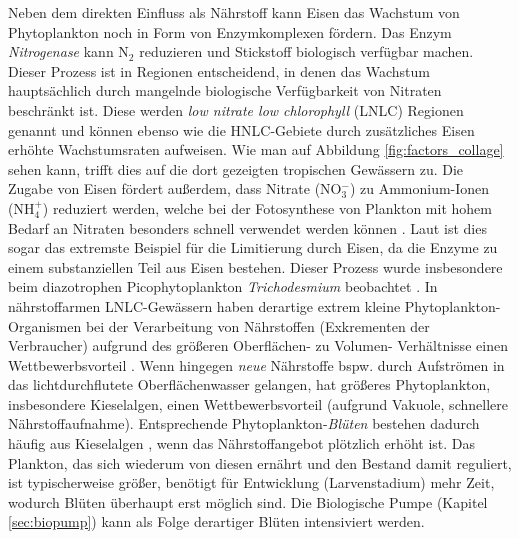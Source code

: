 \documentclass[12pt,a4paper,onecolumn]{scrartcl}
\begin{document}
Neben dem direkten Einfluss als Nährstoff kann Eisen das Wachstum von Phytoplankton noch in Form von Enzymkomplexen fördern. Das Enzym \textit{Nitrogenase} kann N$_2$ reduzieren und Stickstoff biologisch verfügbar machen. Dieser Prozess ist in Regionen entscheidend, in denen das Wachstum hauptsächlich durch mangelnde biologische Verfügbarkeit von Nitraten beschränkt ist. Diese werden \textit{low nitrate low chlorophyll} (LNLC) Regionen genannt und können ebenso wie die HNLC-Gebiete durch zusätzliches Eisen erhöhte Wachstumsraten aufweisen. Wie man auf Abbildung \ref{fig:factors_collage} sehen kann, trifft dies auf die dort gezeigten tropischen Gewässern zu. Die Zugabe von Eisen fördert außerdem, dass Nitrate (NO$_3^-$) zu Ammonium-Ionen (NH$_4^+$) reduziert werden, welche bei der Fotosynthese von Plankton mit hohem Bedarf an Nitraten besonders schnell verwendet werden können \citep{Emerson.2009}. Laut \citet{Emerson.2009} ist dies sogar das extremste Beispiel für die Limitierung durch Eisen, da die Enzyme zu einem substanziellen Teil aus Eisen bestehen. Dieser Prozess wurde insbesondere beim diazotrophen Picophytoplankton \textit{Trichodesmium} beobachtet \citep{Falkowski.1998}. In nährstoffarmen LNLC-Gewässern haben derartige extrem kleine Phytoplankton-Organismen bei der Verarbeitung von Nährstoffen (Exkrementen der Verbraucher) aufgrund des größeren Oberflächen- zu Volumen- Verhältnisse einen Wettbewerbsvorteil \citep{Falkowski.1998}. Wenn hingegen \textit{neue} Nährstoffe bspw. durch Aufströmen in das lichtdurchflutete Oberflächenwasser gelangen, hat größeres Phytoplankton, insbesondere Kieselalgen, einen Wettbewerbsvorteil (aufgrund Vakuole, schnellere Nährstoffaufnahme). Entsprechende Phytoplankton-\textit{Blüten} bestehen dadurch häufig aus Kieselalgen \citep{Boyd.2007}, wenn das Nährstoffangebot plötzlich erhöht ist. Das Plankton, das sich wiederum von diesen ernährt und den Bestand damit reguliert, ist typischerweise größer, benötigt für Entwicklung (Larvenstadium) mehr Zeit, wodurch Blüten überhaupt erst möglich sind. Die Biologische Pumpe (Kapitel \ref{sec:biopump}) kann als Folge derartiger Blüten intensiviert werden. 
\end{document}
